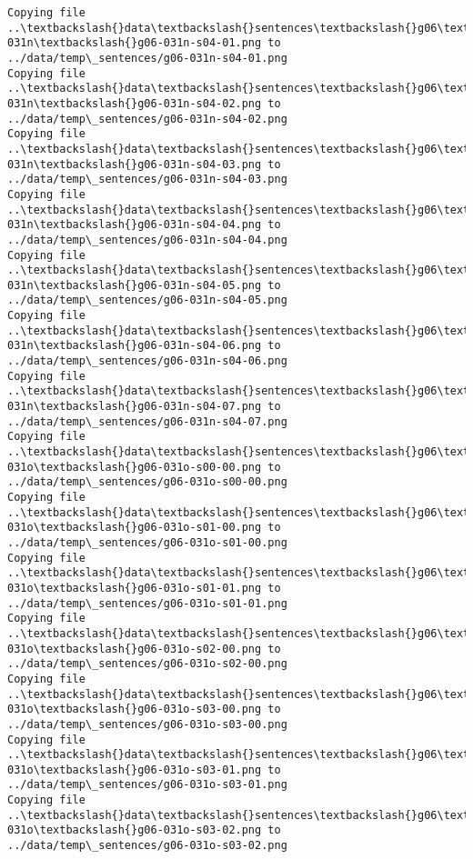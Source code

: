 \documentclass[11pt]{article}
\begin{document}
\begin{Verbatim}[commandchars=\\\{\}]
Copying file ..\textbackslash{}data\textbackslash{}sentences\textbackslash{}g06\textbackslash{}g06-031n\textbackslash{}g06-031n-s04-01.png to
../data/temp\_sentences/g06-031n-s04-01.png
Copying file ..\textbackslash{}data\textbackslash{}sentences\textbackslash{}g06\textbackslash{}g06-031n\textbackslash{}g06-031n-s04-02.png to
../data/temp\_sentences/g06-031n-s04-02.png
Copying file ..\textbackslash{}data\textbackslash{}sentences\textbackslash{}g06\textbackslash{}g06-031n\textbackslash{}g06-031n-s04-03.png to
../data/temp\_sentences/g06-031n-s04-03.png
Copying file ..\textbackslash{}data\textbackslash{}sentences\textbackslash{}g06\textbackslash{}g06-031n\textbackslash{}g06-031n-s04-04.png to
../data/temp\_sentences/g06-031n-s04-04.png
Copying file ..\textbackslash{}data\textbackslash{}sentences\textbackslash{}g06\textbackslash{}g06-031n\textbackslash{}g06-031n-s04-05.png to
../data/temp\_sentences/g06-031n-s04-05.png
Copying file ..\textbackslash{}data\textbackslash{}sentences\textbackslash{}g06\textbackslash{}g06-031n\textbackslash{}g06-031n-s04-06.png to
../data/temp\_sentences/g06-031n-s04-06.png
Copying file ..\textbackslash{}data\textbackslash{}sentences\textbackslash{}g06\textbackslash{}g06-031n\textbackslash{}g06-031n-s04-07.png to
../data/temp\_sentences/g06-031n-s04-07.png
Copying file ..\textbackslash{}data\textbackslash{}sentences\textbackslash{}g06\textbackslash{}g06-031o\textbackslash{}g06-031o-s00-00.png to
../data/temp\_sentences/g06-031o-s00-00.png
Copying file ..\textbackslash{}data\textbackslash{}sentences\textbackslash{}g06\textbackslash{}g06-031o\textbackslash{}g06-031o-s01-00.png to
../data/temp\_sentences/g06-031o-s01-00.png
Copying file ..\textbackslash{}data\textbackslash{}sentences\textbackslash{}g06\textbackslash{}g06-031o\textbackslash{}g06-031o-s01-01.png to
../data/temp\_sentences/g06-031o-s01-01.png
Copying file ..\textbackslash{}data\textbackslash{}sentences\textbackslash{}g06\textbackslash{}g06-031o\textbackslash{}g06-031o-s02-00.png to
../data/temp\_sentences/g06-031o-s02-00.png
Copying file ..\textbackslash{}data\textbackslash{}sentences\textbackslash{}g06\textbackslash{}g06-031o\textbackslash{}g06-031o-s03-00.png to
../data/temp\_sentences/g06-031o-s03-00.png
Copying file ..\textbackslash{}data\textbackslash{}sentences\textbackslash{}g06\textbackslash{}g06-031o\textbackslash{}g06-031o-s03-01.png to
../data/temp\_sentences/g06-031o-s03-01.png
Copying file ..\textbackslash{}data\textbackslash{}sentences\textbackslash{}g06\textbackslash{}g06-031o\textbackslash{}g06-031o-s03-02.png to
../data/temp\_sentences/g06-031o-s03-02.png

\end{Verbatim}
\end{document}
